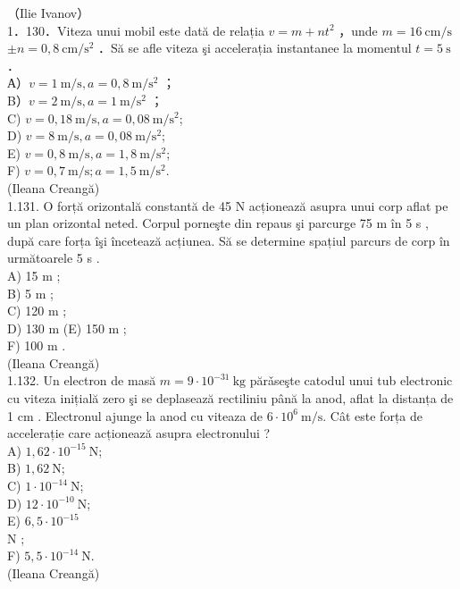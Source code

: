 \documentclass[10pt]{article}
\begin{document}
（Ilie Ivanov）\\
1．130．Viteza unui mobil este dată de relația $v=m+n t^{2}$ ，unde $m=16 \mathrm{~cm} / \mathrm{s}$ $\pm n=0,8 \mathrm{~cm} / \mathrm{s}^{2}$ ．Să se afle viteza şi accelerația instantanee la momentul $t=5 \mathrm{~s}$ ．\\
А）$v=1 \mathrm{~m} / \mathrm{s}, a=0,8 \mathrm{~m} / \mathrm{s}^{2}$ ；\\
B）$v=2 \mathrm{~m} / \mathrm{s}, a=1 \mathrm{~m} / \mathrm{s}^{2}$ ；\\
C) $v=0,18 \mathrm{~m} / \mathrm{s}, a=0,08 \mathrm{~m} / \mathrm{s}^{2}$;\\
D) $v=8 \mathrm{~m} / \mathrm{s}, a=0,08 \mathrm{~m} / \mathrm{s}^{2}$;\\
E) $v=0,8 \mathrm{~m} / \mathrm{s}, a=1,8 \mathrm{~m} / \mathrm{s}^{2}$;\\
F) $v=0,7 \mathrm{~m} / \mathrm{s} ; a=1,5 \mathrm{~m} / \mathrm{s}^{2}$.\\
(Ileana Creangă)\\
1.131. O forță orizontală constantă de 45 N acționează asupra unui corp aflat pe un plan orizontal neted. Corpul porneşte din repaus şi parcurge 75 m în 5 s , după care forța îşi încetează acțiunea. Să se determine spațiul parcurs de corp în următoarele 5 s .\\
A) 15 m ;\\
B) 5 m ;\\
C) 120 m ;\\
D) 130 m (E) 150 m ;\\
F) 100 m .\\
(Ileana Creangă)\\
1.132. Un electron de masă $m=9 \cdot 10^{-31} \mathrm{~kg}$ părǎseşte catodul unui tub electronic cu viteza inițială zero şi se deplasează rectiliniu până la anod, aflat la distanța de 1 cm . Electronul ajunge la anod cu viteaza de $6 \cdot 10^{6} \mathrm{~m} / \mathrm{s}$. Cât este forța de accelerație care acționează asupra electronului ?\\
A) $1,62 \cdot 10^{-15} \mathrm{~N}$;\\
B) $1,62 \mathrm{~N}$;\\
C) $1 \cdot 10^{-14} \mathrm{~N}$;\\
D) $12 \cdot 10^{-10} \mathrm{~N}$;\\
E) $6,5 \cdot 10^{-15}$\\
N ;\\
F) $5,5 \cdot 10^{-14} \mathrm{~N}$.\\
(Ileana Creangă)\\
\end{document}
